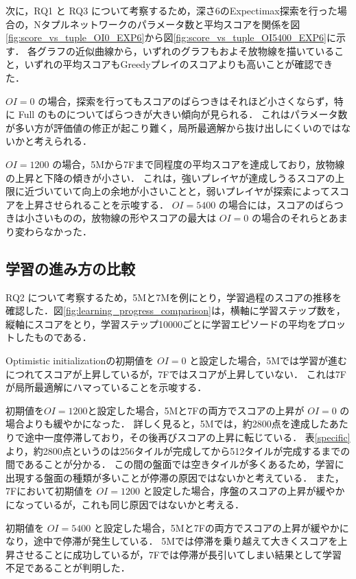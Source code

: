 次に，RQ1 と RQ3 について考察するため，深さ6のExpectimax探索を行った場合の，Nタプルネットワークのパラメータ数と平均スコアを関係を図\ref{fig:score_vs_tuple_OI0_EXP6}から図\ref{fig:score_vs_tuple_OI5400_EXP6}に示す．
各グラフの近似曲線から，いずれのグラフもおよそ放物線を描いていること，いずれの平均スコアもGreedyプレイのスコアよりも高いことが確認できた．

$\mathit{OI}=0$ の場合，探索を行ってもスコアのばらつきはそれほど小さくならず，特に Full のものについてばらつきが大きい傾向が見られる．
これはパラメータ数が多い方が評価値の修正が起こり難く，局所最適解から抜け出しにくいのではないかと考えられる．

$\mathit{OI}=1200$ の場合，\textsf{5M}から\textsf{7F}まで同程度の平均スコアを達成しており，放物線の上昇と下降の傾きが小さい．
これは，強いプレイヤが達成しうるスコアの上限に近づいていて向上の余地が小さいことと，弱いプレイヤが探索によってスコアを上昇させられることを示唆する．
$\mathit{OI}=5400$ の場合には，スコアのばらつきは小さいものの，放物線の形やスコアの最大は $\mathit{OI}=0$ の場合のそれらとあまり変わらなかった．


\subsection{学習の進み方の比較}

RQ2 について考察するため，\textsf{5M}と\textsf{7M}を例にとり，学習過程のスコアの推移を確認した．図\ref{fig:learning_progress_comparison}は，横軸に学習ステップ数を，縦軸にスコアをとり，学習ステップ10000ごとに学習エピソードの平均をプロットしたものである．

Optimistic initializationの初期値を $\mathit{OI}=0$ と設定した場合，\textsf{5M}では学習が進むにつれてスコアが上昇しているが，\textsf{7F}ではスコアが上昇していない．
これは\textsf{7F}が局所最適解にハマっていることを示唆する．

初期値を$\mathit{OI}=1200$と設定した場合，\textsf{5M}と\textsf{7F}の両方でスコアの上昇が $\mathit{OI}=0$ の場合よりも緩やかになった．
詳しく見ると，\textsf{5M}では，約2800点を達成したあたりで途中一度停滞しており，その後再びスコアの上昇に転じている．
表\ref{specific}より，約2800点というのは256タイルが完成してから512タイルが完成するまでの間であることが分かる．
この間の盤面では空きタイルが多くあるため，学習に出現する盤面の種類が多いことが停滞の原因ではないかと考えている．
また，\textsf{7F}において初期値を $\mathit{OI}=1200$ と設定した場合，序盤のスコアの上昇が緩やかになっているが，これも同じ原因ではないかと考える．

初期値を $\mathit{OI}=5400$ と設定した場合，\textsf{5M}と\textsf{7F}の両方でスコアの上昇が緩やかになり，途中で停滞が発生している．
\textsf{5M}では停滞を乗り越えて大きくスコアを上昇させることに成功しているが，\textsf{7F}では停滞が長引いてしまい結果として学習不足であることが判明した．

